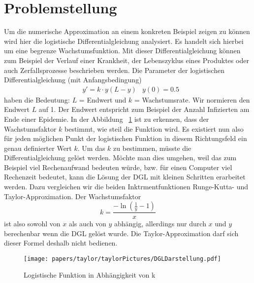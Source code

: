 %
%
%
\section{Problemstellung
\label{taylor:section:problemstellung}}
Um die numerische Approximation an einem konkreten Beispiel zeigen zu können wird hier die logistische Differentialgleichung analysiert.
Es handelt sich hierbei um eine begrenze Wachstumsfunktion. 
Mit dieser Differentialgleichung können zum Beispiel der Verlauf einer Krankheit, der Lebenszyklus eines Produktes oder auch Zerfallsprozesse beschrieben werden. Die Parameter der logistischen Differentialgleichung (mit Anfangsbedingung)
\begin{align*}
	&y' = k\cdot y(L-y) 
	&y(0) = 0.5
	\label{taylor:section:logistifunction}
\end{align*}
haben die Bedeutung: $L$ = Endwert und $k$ = Wachstumsrate.
Wir normieren den Endwert $L$ auf 1.
Der Endwert entspricht zum Beispiel der Anzahl Infizierten am Ende einer Epidemie.
%
%
In der Abbildung ~\ref{taylor:section:fig:DGLDarstellung} ist zu erkennen, dass der Wachstumsfaktor $k$ bestimmt, wie steil die Funktion wird.
Es existiert nun also für jeden möglichen Punkt der logistischen Funktion in diesem Richtungsfeld ein genau definierter Wert $k$.
Um das $k$ zu bestimmen, müsste die Differentialgleichung gelöst werden.
Möchte man dies umgehen, weil das zum Beispiel viel Rechenaufwand bedeuten würde, bzw. für einen Computer viel Rechenzeit bedeutet, kann die Lösung der DGL mit kleinen Schritten erarbeitet werden.
Dazu vergleichen wir die beiden Inktrmentfunktionen Runge-Kutta- und Taylor-Approximation.
%
%
Der Wachstumsfaktor
%
\begin{equation}
k=\frac{-\ln{(\frac{1}{y}-1)}}{x}
\end{equation}
ist also sowohl von $x$ als auch von $y$ abhängig, allerdings nur durch $x$ und $y$ berechenbar wenn die DGL gelöst wurde.
Die Taylor-Approximation darf sich dieser Formel deshalb nicht bedienen.

\begin{figure}
	\centering
	\texttt{[image: papers/taylor/taylorPictures/DGLDarstellung.pdf]}
	\caption{Logistische Funktion in Abhängigkeit von k}
	\label{taylor:section:fig:DGLDarstellung}
\end{figure}

